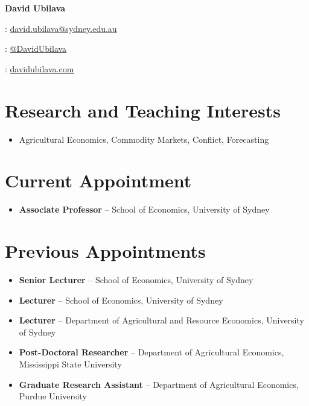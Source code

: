 \documentclass[10pt]{article}
\begin{document}
	
	
	
	\hspace{0.00in}\Large{\bfseries{David Ubilava \faGraduationCap}}
	\normalsize
	
	\medskip
	
	{\faEnvelope: \href{mailto:david.ubilava@sydney.edu.au}{david.ubilava@sydney.edu.au}}
	
	\smallskip
	
	{\faTwitter: \href{https://twitter.com/DavidUbilava}{@DavidUbilava}}
	
	\smallskip
	
	{\faGlobe: \href{https://davidubilava.com}{davidubilava.com}}
	
	
	\medskip
	
	
	\section*{Research and Teaching Interests}
	\begin{itemize}
		\item Agricultural Economics, Commodity Markets, Conflict, Forecasting
	\end{itemize}
	
	\section*{Current Appointment}
	\begin{itemize}
		\item {} \textbf{Associate Professor} -- School of Economics, University of Sydney
	\end{itemize}
	
	\section*{Previous Appointments}
	\begin{itemize}
		\item {} \textbf{Senior Lecturer} -- School of Economics, University of Sydney
		\item {} \textbf{Lecturer} -- School of Economics, University of Sydney
		\item {} \textbf{Lecturer} -- Department of Agricultural and Resource Economics, University of Sydney
		\item {} \textbf{Post-Doctoral Researcher} -- Department of Agricultural Economics, Mississippi State University
		\item {} \textbf{Graduate Research Assistant} -- Department of Agricultural Economics, Purdue University
	\end{itemize}
	
\end{document}
